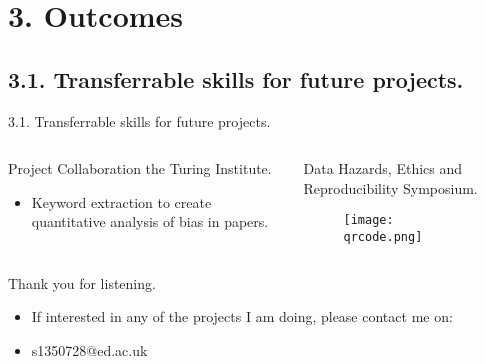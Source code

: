 \documentclass[t]{beamer}
\begin{document}
\section{3. Outcomes}
\subsection{3.1. Transferrable skills for future projects.}
\begin{frame}{3.1. Transferrable skills for future projects.}
	\begin{columns}[T,totalwidth=\textwidth]
  		\begin{column}{0.45\textwidth}
  			\begin{block}{Project Collaboration the Turing Institute.}
    				\begin{itemize}    
    					\item Keyword extraction to create quantitative analysis of bias in papers. 
    				\end{itemize}  
			\end{block}
  		\end{column} %
  		\begin{column}{0.6\textwidth}
  			\begin{block}{Data Hazards, Ethics and Reproducibility Symposium.}
			\begin{figure}
				\vspace{-\blocktitlesize}
				\texttt{[image: qrcode.png]}
			\end{figure}
			\end{block}
  		\end{column}%
	\end{columns}
\end{frame}



\begin{frame}{Thank you for listening.}	
    \begin{itemize}
        \item If interested in any of the projects I am doing, please contact me on:
        \item s1350728@ed.ac.uk
    \end{itemize}
\end{frame}
\end{document}

